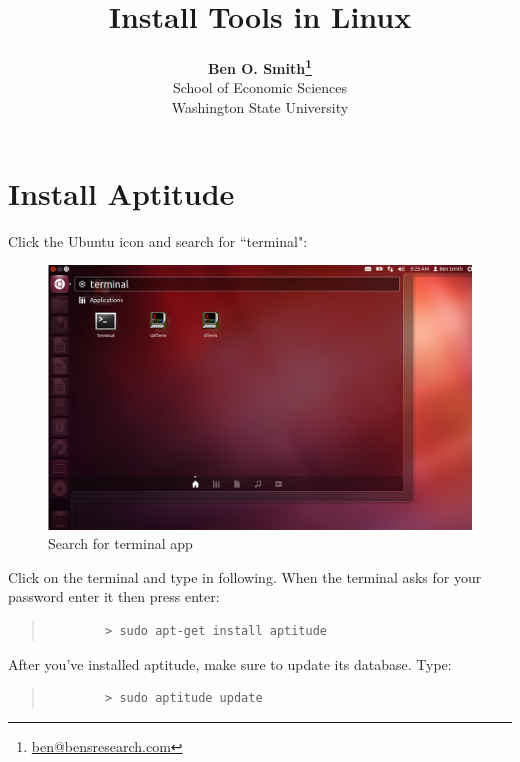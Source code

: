 \documentclass[11pt]{article}
\begin{document}
 

\title{Install Tools in Linux}
\date{}
\author{\textbf{Ben O. Smith\footnote{\href{mailto:ben@bensresearch.com}{ben@bensresearch.com}}} \\
School of Economic Sciences \\
Washington State University}
\maketitle \doublespace

\section{Install Aptitude}

Click the Ubuntu icon and search for ``terminal":

\begin{figure}[!h]
	\centering
	\includegraphics[width=5in]{graphics/OpenTerminal.png}	\caption{Search for terminal app}
\end{figure}

Click on the terminal and type in following. When the terminal asks for your password enter it then press enter:

\begin{quote}
	\begin{verbatim}
		> sudo apt-get install aptitude
	\end{verbatim}
\end{quote}

After you've installed aptitude, make sure to update its database. Type:

\begin{quote}
	\begin{verbatim}
		> sudo aptitude update
	\end{verbatim}
\end{quote}
\end{document}
